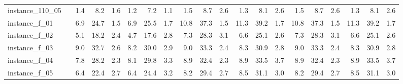 \documentclass[12pt,a4paper,openright,twoside]{book}
\begin{document}
\begin{table}[H]
{\begin{tabular}{|ll|rrrrrr|rrrrrr|rrrrrr|}
instance\_110\_05             &     &     1.4  &   8.2  &  1.6  &   1.2  &   7.2  &  1.1  &     1.5  &   8.7  &  2.6  &   1.3  &   8.1  &  2.6  &    1.5  &   8.7  &  2.6  &   1.3  &   8.1  &  2.6   \\    
instance\_f\_01               &     &    6.9  &   24.7  &  1.5  &   6.9  &   25.5  &  1.7  &   10.8  &   37.3  &  1.5  &   11.3  &   39.2  &  1.7  &   10.8  &   37.3  &  1.5  &   11.3  &   39.2  &  1.7  \\    
instance\_f\_02               &     &     5.1  &   18.2  &  2.4  &   4.7  &   17.6  &  2.8  &   7.3  &   28.3  &  3.1  &   6.6  &   25.1  &  2.6  &   7.3  &   28.3  &  3.1  &   6.6  &   25.1  &  2.6  \\       
instance\_f\_03               &     &    9.0  &   32.7  &  2.6  &   8.2  &   30.0  &  2.9  &   9.0  &   33.3  &  2.4  &   8.3  &   30.9  &  2.8  &   9.0  &   33.3  &  2.4  &   8.3  &   30.9  &  2.8  \\     
instance\_f\_04               &     &     7.8  &   28.2  &  2.3  &   8.1  &   29.8  &  3.3  &   8.9  &   32.4  &  2.3  &   8.9  &   33.5  &  3.7  &   8.9  &   32.4  &  2.3  &   8.9  &   33.5  &  3.7  \\       
instance\_f\_05               &     &    6.4  &   22.4  &  2.7  &   6.4  &   24.4  &  3.2  &   8.2  &   29.4  &  2.7  &   8.5  &   31.1  &  3.0  &   8.2  &   29.4  &  2.7  &   8.5  &   31.1  &  3.0  \\   
 \hline
\end{tabular}
}
\end{table}
\end{document}

